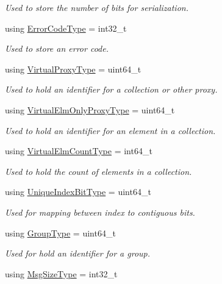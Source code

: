 \begin{DoxyCompactItemize}
\begin{DoxyCompactList}\small\item\em Used to store the number of bits for serialization. \end{DoxyCompactList}\item 
using \hyperlink{namespacevt_a793764d753923abc3d32929870beb485}{Error\+Code\+Type} = int32\+\_\+t
\begin{DoxyCompactList}\small\item\em Used to store an error code. \end{DoxyCompactList}\item 
using \hyperlink{namespacevt_a1b417dd5d684f045bb58a0ede70045ac}{Virtual\+Proxy\+Type} = uint64\+\_\+t
\begin{DoxyCompactList}\small\item\em Used to hold an identifier for a collection or other proxy. \end{DoxyCompactList}\item 
using \hyperlink{namespacevt_aa68633cd16822ae31c1cf521f817a23e}{Virtual\+Elm\+Only\+Proxy\+Type} = uint64\+\_\+t
\begin{DoxyCompactList}\small\item\em Used to hold an identifier for an element in a collection. \end{DoxyCompactList}\item 
using \hyperlink{namespacevt_ac115668758184050beff7a9281a2c490}{Virtual\+Elm\+Count\+Type} = int64\+\_\+t
\begin{DoxyCompactList}\small\item\em Used to hold the count of elements in a collection. \end{DoxyCompactList}\item 
using \hyperlink{namespacevt_a913e1f07b5228dd8bb64040dc6dcea14}{Unique\+Index\+Bit\+Type} = uint64\+\_\+t
\begin{DoxyCompactList}\small\item\em Used for mapping between index to contiguous bits. \end{DoxyCompactList}\item 
using \hyperlink{namespacevt_a27b5e4411c9b6140c49100e050e2f743}{Group\+Type} = uint64\+\_\+t
\begin{DoxyCompactList}\small\item\em Used for hold an identifier for a group. \end{DoxyCompactList}\item 
using \hyperlink{namespacevt_abfa009d900299ac1df967b40ea8f2c8a}{Msg\+Size\+Type} = int32\+\_\+t

\end{DoxyCompactItemize}
